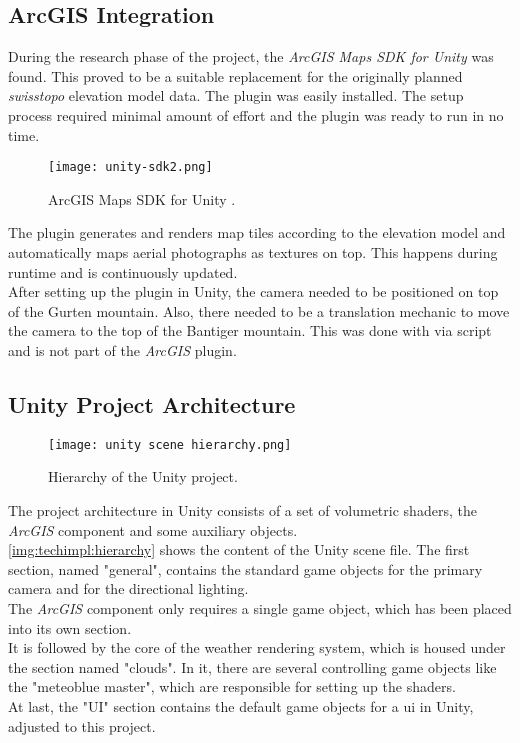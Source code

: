 \subsection{ArcGIS Integration}
\label{section:techimpl:arcgis}
During the research phase of the project, the \emph{ArcGIS Maps SDK for Unity} \cite{arcgis:unitysdk} was found. This proved to be a suitable replacement for the originally planned \emph{swisstopo} elevation model data.
The plugin was easily installed. The setup process required minimal amount of effort and the plugin was ready to run in no time. 

\begin{figure}[H]
    \texttt{[image: unity-sdk2.png]}
    \caption{ArcGIS Maps SDK for Unity \protect\cite{arcgis:unitysdk}.}
\end{figure}

\noindent
The plugin generates and renders map tiles according to the elevation model and automatically maps aerial photographs as textures on top.
This happens during runtime and is continuously updated.
\\
After setting up the plugin in Unity, the camera needed to be positioned on top of the Gurten mountain. Also, there needed to be a translation mechanic to move the camera to the top of the Bantiger mountain.
This was done with via script and is not part of the \emph{ArcGIS} plugin.

\subsection{Unity Project Architecture}
\begin{wrapfigure}[13]{r}{4cm}
    \vspace{-\baselineskip}
    \texttt{[image: unity scene hierarchy.png]}
    \caption{Hierarchy of the Unity project.}
    \label{img:techimpl:hierarchy}
\end{wrapfigure}
The project architecture in Unity consists of a set of \gls{volumetric} \gls{shader}s, the \emph{ArcGIS} component and some auxiliary objects.
\\
\autoref{img:techimpl:hierarchy} shows the content of the Unity scene file.
The first section, named "general", contains the standard game objects for the primary camera and for the directional lighting.
\\
The \emph{ArcGIS} component only requires a single game object, which has been placed into its own section.
\\
It is followed by the core of the weather rendering system, which is housed under the section named "clouds".
In it, there are several controlling game objects like the "meteoblue master", which are responsible for setting up the shaders.
\\
At last, the "UI" section contains the default game objects for a \gls{ui} in Unity, adjusted to this project.


